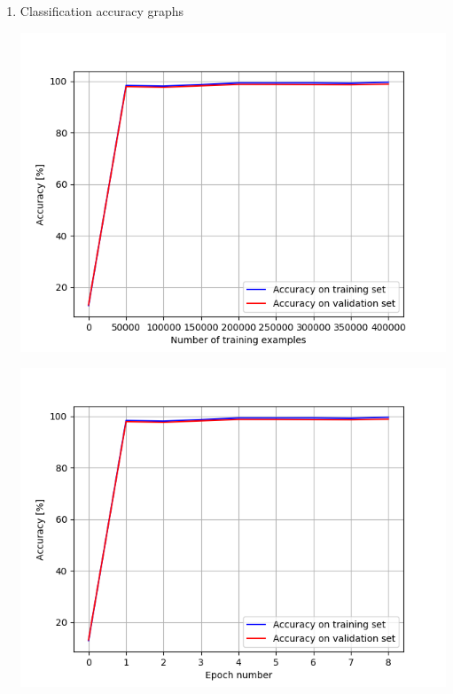 \documentclass[a4paper]{iacas}
\begin{document}
\begin{enumerate}
\item Classification accuracy graphs

\vskip 0.1in
\begin{minipage}{\linewidth}
	\includegraphics[scale=0.8]{hw2_py/results/_14_01_43/lr_0_01_net_1_L2_norm_/accuracy.png}
	\label{fig_16}
\end{minipage}
\vskip 0.1in
\begin{minipage}{\linewidth}
	\includegraphics[scale=0.8]{hw2_py/results/_14_01_43/lr_0_01_net_1_L2_norm_/accuracy_epoch.png}
	\label{fig_17}
\end{minipage}
\vskip 0.1in



\end{enumerate}
\end{document}
